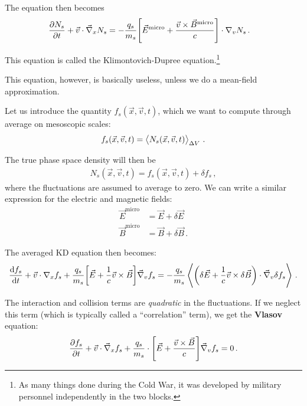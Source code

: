 \documentclass[main.tex]{subfiles}
\begin{document}

The equation then becomes 
%
\begin{align}
\pdv{N_s}{t} + \vec{v} \cdot \vec{\nabla}_x N_s 
&= - \frac{q_s}{m_s} \qty[\vec{E}^{\text{micro}} + \frac{\vec{v} \times \vec{B}^{\text{micro}}}{c}] \cdot \nabla_v N_s
\,.
\end{align}

This equation is called the Klimontovich-Dupree equation.\footnote{As many things done during the Cold War, it was developed by military personnel independently in the two blocks. } 

This equation, however, is basically useless, unless we do a mean-field approximation. 

Let us introduce the quantity \(f_s (\vec{x}, \vec{v}, t)\), which we want to compute through average on mesoscopic scales: 
%
\begin{align}
f_s (\vec{x}, \vec{v}, t) = \expval{N_s (\vec{x}, \vec{v}, t)}_{\Delta V}
\,.
\end{align}

The true phase space density will then be 
%
\begin{align}
N_s (\vec{x}, \vec{v}, t) = f_s (\vec{x}, \vec{v}, t) + \delta f_s
\,,
\end{align}
%
where the fluctuations are assumed to average to zero. 
We can write a similar expression for the electric and magnetic fields: 
%
\begin{align}
\vec{E}^{\text{micro}} &= \vec{E} + \delta \vec{E} \\
\vec{B}^{\text{micro}} &= \vec{B} + \delta \vec{B}
\,.
\end{align}

The averaged KD equation then becomes: 
%
\begin{align}
\dv{f_s}{t} + \vec{v} \cdot \nabla_x f_s + \frac{q_s}{m_s} 
\qty[\vec{E} + \frac{1}{c} \vec{v} \times \vec{B}] \vec{\nabla}_v f_s = - \frac{q_s}{m_s} \expval{
    \qty( \delta \vec{E} + \frac{1}{c} \vec{v} \times \delta \vec{B} ) \cdot \vec{\nabla}_v \delta f_s
}
\,.
\end{align}

The interaction and collision terms are \emph{quadratic} in the fluctuations. 
If we neglect this term (which is typically called a ``correlation'' term), we get the \textbf{Vlasov} equation: 
%
\begin{align}
\pdv{f_s}{t} + \vec{v} \cdot \vec{\nabla}_x f_s + \frac{q_s}{m_s} \cdot \qty[ \vec{E} + \frac{\vec{v} \times \vec{B}}{c}] \vec{\nabla}_v f_s = 0
\,.
\end{align}
\end{document}
